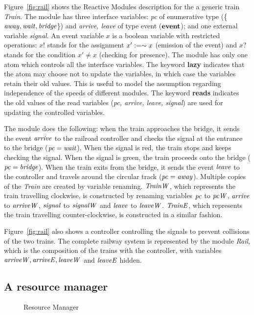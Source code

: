 \mypar Figure~\ref{fig:rail} shows the Reactive Modules
description for the a generic train {\it Train}. The module has
three interface variables: {\it pc} of enumerative type (\{${\it away\/},
{\it wait\/}, {\it bridge\/}$\}) and {\it arrive, leave} of type event
(${\hbox {\bf event\/}}$); and one external variable {\it signal}. An event
variable $x$ is a boolean variable with restricted operations:
$x!$ stands for the assignment $x':=\sim x$ (emission of the
event) and $x?$ stands for the condition $x'\neq x$ (checking for
presence). The module has only one atom which controls all the
interface variables. The keyword {\bf lazy} indicates that the
atom may choose not to update the variables, in which case the
variables retain their old values. This is useful to model the
assumption regarding independence of the speeds of different
modules. The keyword {\bf reads} indicates the old values of the
read variables ({\it pc, arrive, leave, signal}) are used for
updating the controlled variables.

\mypar The module does the following: when the train approaches
the bridge, it sends the event ${\it arrive\/}$ to the railroad
controller and checks the signal at the entrance to the bridge
(${\it pc\/}={\it wait\/}$).  When the signal is red, the train stops and keeps
checking the signal.  When the signal is green, the train proceeds
onto the bridge (${\it pc\/}={\it bridge\/}$). When the train exits from the
bridge, it sends the event ${\it leave\/}$ to the controller and travels
around the circular track (${\it pc\/}={\it away\/}$). Multiple copies of the
{\it Train} are created by variable renaming. ${\it TrainW\/}$, which
represents the train travelling clockwise, is constructed by
renaming variables ${\it pc\/}$ to ${\it pcW\/}$, ${\it arrive\/}$ to ${\it arriveW\/}$,
${\it signal\/}$ to ${\it signalW\/}$ and ${\it leave\/}$ to ${\it leaveW\/}$. ${\it TrainE\/}$,
which represents the train travelling counter-clockwise, is
constructed in a similar fashion.

\mypar
Figure~\ref{fig:rail} also shows a controller controlling the signals to
prevent collisions of the two trains. The complete railway system is represented by the module {\it Rail},
which is the composition of the trains with the controller, with
variables ${\it arriveW\/}, {\it arriveE\/}, {\it leaveW\/}$ and ${\it leaveE\/}$ hidden.

\subsection{ A resource manager}

\begin{figure}
\label{fig:rmanager}
\begin{center}
\resizebox{!}{35ex}{}
\caption{ Resource Manager}
\end{center}
\end{figure}

